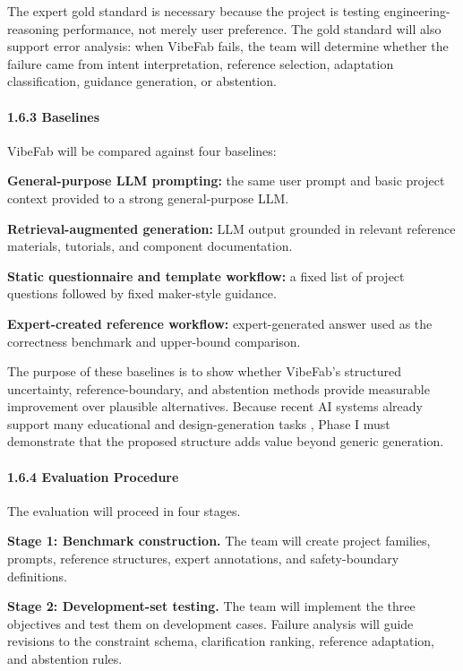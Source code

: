 The expert gold standard is necessary because the project is testing engineering-reasoning performance, not merely user preference. The gold standard will also support error analysis: when VibeFab fails, the team will determine whether the failure came from intent interpretation, reference selection, adaptation classification, guidance generation, or abstention.
\vspace{-10pt}
\paragraph{1.6.3 Baselines}

VibeFab will be compared against four baselines:

\textbf{General-purpose LLM prompting:} the same user prompt and basic project context provided to a strong general-purpose LLM.

\textbf{Retrieval-augmented generation:} LLM output grounded in relevant reference materials, tutorials, and component documentation.

\textbf{Static questionnaire and template workflow:} a fixed list of project questions followed by fixed maker-style guidance.

\textbf{Expert-created reference workflow:} expert-generated answer used as the correctness benchmark and upper-bound comparison.

The purpose of these baselines is to show whether VibeFab's structured uncertainty, reference-boundary, and abstention methods provide measurable improvement over plausible alternatives. Because recent AI systems already support many educational and design-generation tasks \cite{denny2024gaied,wang2024llmedu,srinivasan2026pcbgenai,flux2026copilot,circuitmind2025product}, Phase I must demonstrate that the proposed structure adds value beyond generic generation.

\vspace{-10pt}
\paragraph{1.6.4 Evaluation Procedure}

The evaluation will proceed in four stages.

\textbf{Stage 1: Benchmark construction.} The team will create project families, prompts, reference structures, expert annotations, and safety-boundary definitions.

\textbf{Stage 2: Development-set testing.} The team will implement the three objectives and test them on development cases. Failure analysis will guide revisions to the constraint schema, clarification ranking, reference adaptation, and abstention rules.

